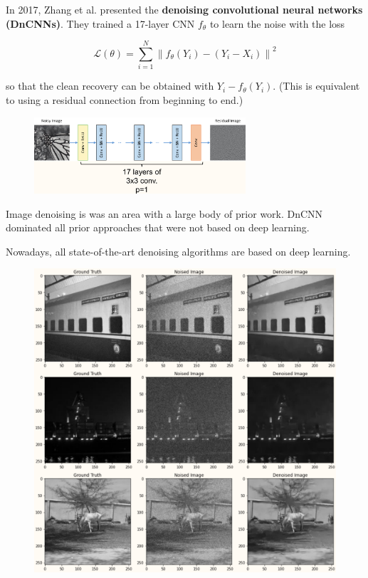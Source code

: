 \documentclass{report}
\begin{document}
\begin{definition}[8.4][DnCNN]
    In 2017, Zhang et al. presented the \textbf{denoising convolutional neural networks (DnCNNs)}. They trained a 17-layer CNN $f_{\theta}$ to learn the noise with the loss

    $$
    \mathcal{L}(\theta)=\sum_{i=1}^{N}\left\|f_{\theta}\left(Y_{i}\right)-\left(Y_{i}-X_{i}\right)\right\|^{2}
    $$

    so that the clean recovery can be obtained with $Y_{i}-f_{\theta}\left(Y_{i}\right)$. (This is equivalent to using a residual connection from beginning to end.)

    \begin{figure}[H]
        \centering
        \includegraphics[width=0.7\textwidth]{.././assets/8.1.png}
    \end{figure}

    \par\noindent\textcolor{gray}{\hdashrule{\textwidth}{0.4pt}{1pt 2pt}}

    Image denoising is was an area with a large body of prior work. DnCNN dominated all prior approaches that were not based on deep learning.

    Nowadays, all state-of-the-art denoising algorithms are based on deep learning.

    \begin{figure}[H]
        \centering
        \includegraphics[width=1.0\textwidth]{.././assets/8.2.png}
    \end{figure}


\end{definition}
\end{document}
